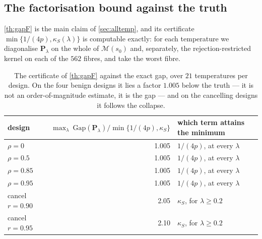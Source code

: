 \documentclass[aos]{imsart}
\theoremstyle{plain}
\theoremstyle{definition}
\begin{document}
    \subsection{The factorisation bound against the truth}
    \label{sub:factnum}

    \cref{th:gapF} is the main claim of \cref{sec:alltemp}, and its
    certificate $\min\{1/(4p),\kappa_S(\lambda)\}$ is computable exactly:
    for each temperature we diagonalise $\mathbf{P}_\lambda$ on the whole of
    $\mathscr{M}(s_0)$ and, separately, the rejection-restricted kernel on
    each of the $562$ fibres, and take the worst fibre.

    \begin{table}[t]
        \centering
        \small
        \begin{tabular}{lrl}
            \hline
            design & $\max_\lambda\
            \mathrm{Gap}(\mathbf{P}_\lambda)/
            \min\{1/(4p),\kappa_S\}$ & which term attains the minimum\\
            \hline
            $\rho=0$        & 1.005 & $1/(4p)$, at every $\lambda$\\
            $\rho=0.5$      & 1.005 & $1/(4p)$, at every $\lambda$\\
            $\rho=0.85$     & 1.005 & $1/(4p)$, at every $\lambda$\\
            $\rho=0.95$     & 1.005 & $1/(4p)$, at every $\lambda$\\
            cancel $r=0.90$ & 2.05  & $\kappa_S$, for $\lambda\geq0.2$\\
            cancel $r=0.95$ & 2.10  & $\kappa_S$, for $\lambda\geq0.2$\\
            \hline
        \end{tabular}
        \caption{The certificate of \cref{th:gapF} against the exact gap,
        over $21$ temperatures per design. On the four benign designs it
        lies a factor $1.005$ below the truth --- it is not an
        order-of-magnitude estimate, it is the gap --- and on the cancelling
        designs it follows the collapse.}
        \label{tab:fact}
    \end{table}
\end{document}
